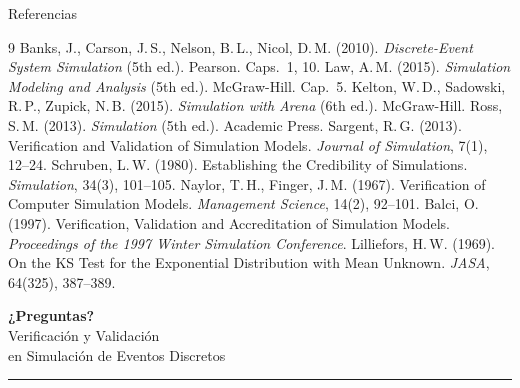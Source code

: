 \documentclass[aspectratio=1610, 10pt]{beamer}
\begin{document}
\begin{frame}{Referencias}
  \footnotesize
  \begin{thebibliography}{9}
   Banks, J., Carson, J.\,S., Nelson, B.\,L., Nicol, D.\,M. (2010).
    \emph{Discrete-Event System Simulation} (5th ed.). Pearson. Caps.\ 1, 10.
   Law, A.\,M. (2015).
    \emph{Simulation Modeling and Analysis} (5th ed.). McGraw-Hill. Cap.\ 5.
   Kelton, W.\,D., Sadowski, R.\,P., Zupick, N.\,B. (2015).
    \emph{Simulation with Arena} (6th ed.). McGraw-Hill.
   Ross, S.\,M. (2013).
    \emph{Simulation} (5th ed.). Academic Press.
   Sargent, R.\,G. (2013).
    Verification and Validation of Simulation Models.
    \emph{Journal of Simulation}, 7(1), 12--24.
   Schruben, L.\,W. (1980).
    Establishing the Credibility of Simulations.
    \emph{Simulation}, 34(3), 101--105.
   Naylor, T.\,H., Finger, J.\,M. (1967).
    Verification of Computer Simulation Models.
    \emph{Management Science}, 14(2), 92--101.
   Balci, O. (1997).
    Verification, Validation and Accreditation of Simulation Models.
    \emph{Proceedings of the 1997 Winter Simulation Conference}.
   Lilliefors, H.\,W. (1969).
    On the KS Test for the Exponential Distribution with Mean Unknown.
    \emph{JASA}, 64(325), 387--389.
  \end{thebibliography}
\end{frame}

\begin{frame}
  \begin{center}
    {\Huge \color{mobiblue}\textbf{¿Preguntas?}}\\[0.5cm]
    \large Verificación y Validación\\ en Simulación de Eventos Discretos\\[0.5cm]
    {\color{mobigold}\rule{0.5\textwidth}{1.2pt}}
  \end{center}
\end{frame}
\end{document}
